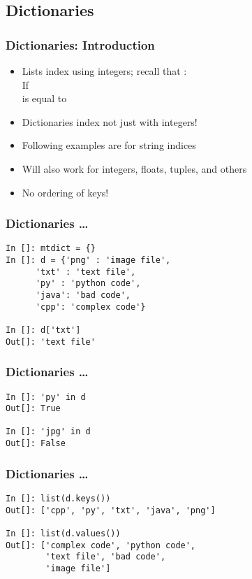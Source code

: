 \documentclass[14pt,compress]{beamer}
\begin{document}
\subsection{Dictionaries}

\begin{frame}[fragile]
  \frametitle{Dictionaries: Introduction}
  \begin{itemize}
  \item Lists index using integers; recall that :\\
    \vspace*{1em}
      If \\
       is equal to 
      \vspace*{2em}
    \item Dictionaries index not just with integers!
    \item Following examples are for string indices
    \item Will also work for integers, floats, tuples, and others
    \item \alert{No ordering of keys!}
  \end{itemize}
\end{frame}

\begin{frame}[fragile]
  \frametitle{Dictionaries \ldots}
\begin{lstlisting}
In []: mtdict = {}
In []: d = {'png' : 'image file',
      'txt' : 'text file',
      'py' : 'python code',
      'java': 'bad code',
      'cpp': 'complex code'}

In []: d['txt']
Out[]: 'text file'
  \end{lstlisting}
\end{frame}

\begin{frame}[fragile]
  \frametitle{Dictionaries \ldots}
  \begin{lstlisting}
In []: 'py' in d
Out[]: True

In []: 'jpg' in d
Out[]: False
  \end{lstlisting}
\end{frame}

\begin{frame}[fragile]
  \frametitle{Dictionaries \ldots}
  \begin{small}
    \begin{lstlisting}
In []: list(d.keys())
Out[]: ['cpp', 'py', 'txt', 'java', 'png']

In []: list(d.values())
Out[]: ['complex code', 'python code',
        'text file', 'bad code',
        'image file']
    \end{lstlisting}
  \end{small}
\end{frame}
\end{document}
